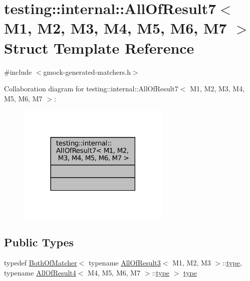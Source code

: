 \hypertarget{structtesting_1_1internal_1_1AllOfResult7}{}\section{testing\+:\+:internal\+:\+:All\+Of\+Result7$<$ M1, M2, M3, M4, M5, M6, M7 $>$ Struct Template Reference}
\label{structtesting_1_1internal_1_1AllOfResult7}


{\ttfamily \#include $<$gmock-\/generated-\/matchers.\+h$>$}



Collaboration diagram for testing\+:\+:internal\+:\+:All\+Of\+Result7$<$ M1, M2, M3, M4, M5, M6, M7 $>$\+:
\nopagebreak
\begin{figure}[H]
\begin{center}
\leavevmode
\includegraphics[width=206pt]{structtesting_1_1internal_1_1AllOfResult7__coll__graph}
\end{center}
\end{figure}
\subsection*{Public Types}
\begin{DoxyCompactItemize}
\item 
typedef \hyperlink{classtesting_1_1internal_1_1BothOfMatcher}{Both\+Of\+Matcher}$<$ typename \hyperlink{structtesting_1_1internal_1_1AllOfResult3}{All\+Of\+Result3}$<$ M1, M2, M3 $>$\+::\hyperlink{structtesting_1_1internal_1_1AllOfResult7_a47ab0d670258434b0e65530591948e8c}{type}, typename \hyperlink{structtesting_1_1internal_1_1AllOfResult4}{All\+Of\+Result4}$<$ M4, M5, M6, M7 $>$\+::\hyperlink{structtesting_1_1internal_1_1AllOfResult7_a47ab0d670258434b0e65530591948e8c}{type} $>$ \hyperlink{structtesting_1_1internal_1_1AllOfResult7_a47ab0d670258434b0e65530591948e8c}{type}
\end{DoxyCompactItemize}


